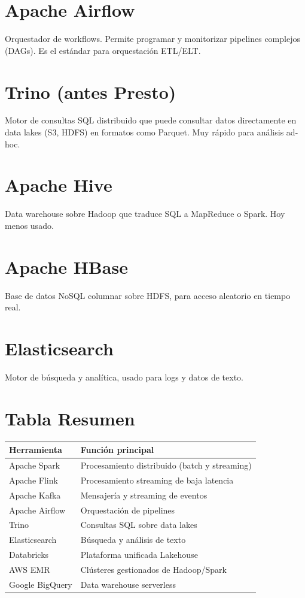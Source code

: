 \documentclass[12pt,a4paper,openany,oneside]{book}
\begin{document}
\section{Apache Airflow}
Orquestador de workflows. Permite programar y monitorizar pipelines complejos (DAGs). Es el estándar para orquestación ETL/ELT.

\section{Trino (antes Presto)}
Motor de consultas SQL distribuido que puede consultar datos directamente en data lakes (S3, HDFS) en formatos como Parquet. Muy rápido para análisis ad-hoc.

\section{Apache Hive}
Data warehouse sobre Hadoop que traduce SQL a MapReduce o Spark. Hoy menos usado.

\section{Apache HBase}
Base de datos NoSQL columnar sobre HDFS, para acceso aleatorio en tiempo real.

\section{Elasticsearch}
Motor de búsqueda y analítica, usado para logs y datos de texto.

\section{Tabla Resumen}
\begin{center}
\begin{tabular}{|l|l|}
\hline
\textbf{Herramienta} & \textbf{Función principal} \\ \hline
Apache Spark & Procesamiento distribuido (batch y streaming) \\
Apache Flink & Procesamiento streaming de baja latencia \\
Apache Kafka & Mensajería y streaming de eventos \\
Apache Airflow & Orquestación de pipelines \\
Trino & Consultas SQL sobre data lakes \\
Elasticsearch & Búsqueda y análisis de texto \\
Databricks & Plataforma unificada Lakehouse \\
AWS EMR & Clústeres gestionados de Hadoop/Spark \\
Google BigQuery & Data warehouse serverless \\ \hline
\end{tabular}
\end{center}
\end{document}
